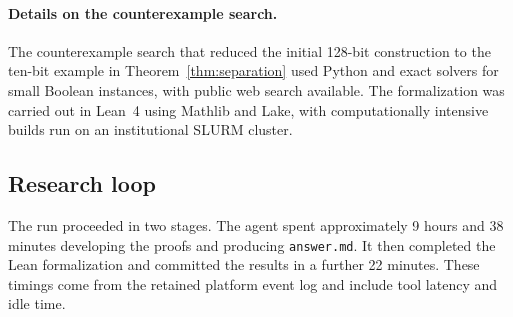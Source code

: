 \documentclass{article}
\theoremstyle{definition}
\theoremstyle{plain}
\begin{document}
\paragraph{Details on the counterexample search.} The counterexample search that reduced the initial 128-bit construction to the ten-bit example in Theorem~\ref{thm:separation} used Python and exact solvers for small Boolean instances, with public web search available. The formalization was carried out in Lean~4 using Mathlib and Lake, with computationally intensive builds run on an institutional SLURM cluster.

\subsection{Research loop}


The run proceeded in two stages. The agent spent approximately 9 hours and 38 minutes developing the proofs and producing \texttt{answer.md}. It then completed the Lean formalization and committed the results in a further 22 minutes. These timings come from the retained platform event log and include tool latency and idle time.

\end{document}
